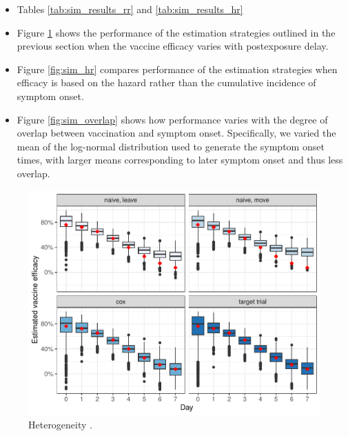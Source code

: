 \begin{appendix}
    \begin{itemize}
        \item Tables \ref{tab:sim_results_rr} and \ref{tab:sim_results_hr} 
        \item Figure \ref{fig:sim_hetx} shows the performance of the estimation strategies outlined in the previous section when the vaccine efficacy varies with postexposure delay. 
        \item Figure \ref{fig:sim_hr} compares performance of the estimation strategies when efficacy is based on the hazard rather than the cumulative incidence of symptom onset.
        \item Figure \ref{fig:sim_overlap} shows how performance varies with the degree of overlap between vaccination and symptom onset. Specifically, we varied the mean of the log-normal distribution used to generate the symptom onset times, with larger means corresponding to later symptom onset and thus less overlap.
    \end{itemize}

    \begin{table}[p]
        \centering
        \caption{}\label{tab:sim_results_rr}
        
    \end{table}

    \begin{table}[p]
        \centering
        \caption{}\label{tab:sim_results_hr}
        
    \end{table}

    \clearpage

    \begin{figure}[p]
        \centering
        \includegraphics{../3_figures/sim_hetx.pdf}
        \caption{Heterogeneity .\label{fig:sim_hetx}}
    \end{figure}


\end{appendix}
